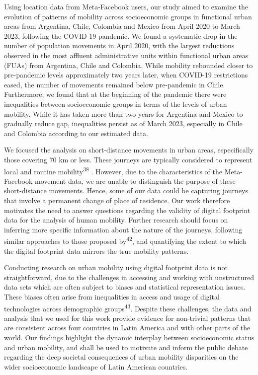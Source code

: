 \documentclass[
  11pt,
]{article}
\begin{document}
Using location data from Meta-Facebook users, our study aimed to examine
the evolution of patterns of mobility across socioeconomic groups in
functional urban areas from Argentina, Chile, Colombia and Mexico from
April 2020 to March 2023, following the COVID-19 pandemic. We found a
systematic drop in the number of population movements in April 2020,
with the largest reductions observed in the most affluent administrative
units within functional urban areas (FUAs) from Argentina, Chile and
Colombia. While mobility rebounded closer to pre-pandemic levels
approximately two years later, when COVID-19 restrictions eased, the
number of movements remained below pre-pandemic in Chile. Furthermore,
we found that at the beginning of the pandemic there were inequalities
between socioeconomic groups in terms of the levels of urban mobility.
While it has taken more than two years for Argentina and Mexico to
gradually reduce gap, inequalities persist as of March 2023, especially
in Chile and Colombia according to our estimated data.

We focused the analysis on short-distance movements in urban areas,
especifically those covering 70 km or less. These journeys are typically
considered to represent local and routine mobility\textsuperscript{38} .
However, due to the characteristics of the Meta-Facebook movement data,
we are unable to distinguish the purpose of these short-distance
movements. Hence, some of our data could be capturing journeys that
involve a permanent change of place of residence. Our work therefore
motivates the need to answer questions regarding the validity of digital
footprint data for the analysis of human mobility. Further research
should focus on inferring more specific information about the nature of
the journeys, following similar approaches to those proposed
by\textsuperscript{42}, and quantifying the extent to which the digital
footprint data mirrors the true mobility patterns.

Conducting research on urban mobility using digital footprint data is
not straightforward, due to the challenges in accessing and working with
unstructured data sets which are often subject to biases and statistical
representation issues. These biases often arise from inequalities in
access and usage of digital technologies across demographic
groups\textsuperscript{43}. Despite these challenges, the data and
analysis that we used for this work provide evidence for non-trivial
patterns that are consistent across four countries in Latin America and
with other parts of the world. Our findings highlight the dynamic
interplay between socioeconomic status and urban mobility, and shall be
used to motivate and inform the public debate regarding the deep
societal consequences of urban mobility disparities on the wider
socioeconomic landscape of Latin American countries.
\end{document}
